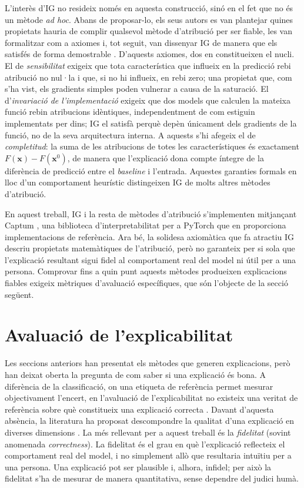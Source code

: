 L'interès d'\ac{IG} no resideix només en aquesta construcció, sinó en el fet que no és un mètode \emph{ad hoc}. Abans de proposar-lo, els seus autors es van plantejar quines propietats hauria de complir qualsevol mètode d'atribució per ser fiable, les van formalitzar com a axiomes i, tot seguit, van dissenyar \ac{IG} de manera que els satisfés de forma demostrable \cite{Sundarajan2017}. D'aquests axiomes, dos en constitueixen el nucli. El de \emph{sensibilitat} exigeix que tota característica que influeix en la predicció rebi atribució no nul·la i que, si no hi influeix, en rebi zero; una propietat que, com s'ha vist, els gradients simples poden vulnerar a causa de la saturació. El d'\emph{invariació de l'implementació} exigeix que dos models que calculen la mateixa funció rebin atribucions idèntiques, independentment de com estiguin implementats per dins; \ac{IG} el satisfà perquè depèn únicament dels gradients de la funció, no de la seva arquitectura interna. A aquests s'hi afegeix el de \emph{completitud}: la suma de les atribucions de totes les característiques és exactament $F(\mathbf{x}) - F(\mathbf{x}^0)$, de manera que l'explicació dona compte íntegre de la diferència de predicció entre el \emph{baseline} i l'entrada. Aquestes garanties formals en lloc d'un comportament heurístic distingeixen \ac{IG} de molts altres mètodes d'atribució.

En aquest treball, \ac{IG} i la resta de mètodes d'atribució s'implementen mitjançant Captum \cite{Kokhlikyan2020}, una biblioteca d'interpretabilitat per a PyTorch que en proporciona implementacions de referència. Ara bé, la solidesa axiomàtica que fa atractiu \ac{IG} descriu propietats matemàtiques de l'atribució, però no garanteix per si sola que l'explicació resultant sigui fidel al comportament real del model ni útil per a una persona. Comprovar fins a quin punt aquests mètodes produeixen explicacions fiables exigeix mètriques d'avaluació específiques, que són l'objecte de la secció següent.

\section{Avaluació de l'explicabilitat}
Les seccions anteriors han presentat els mètodes que generen explicacions, però han deixat oberta la pregunta de com saber si una explicació és bona. A diferència de la classificació, on una etiqueta de referència permet mesurar objectivament l'encert, en l'avaluació de l'explicabilitat no existeix una veritat de referència sobre què constitueix una explicació correcta \cite{Longo2024}. Davant d'aquesta absència, la literatura ha proposat descompondre la qualitat d'una explicació en diverses dimensions \cite{Hesse2023}. La més rellevant per a aquest treball és la \emph{fidelitat} (sovint anomenada \emph{correctness}). La fidelitat és el grau en què l'explicació reflecteix el comportament real del model, i no simplement allò que resultaria intuïtiu per a una persona. Una explicació pot ser plausible i, alhora, infidel; per això la fidelitat s'ha de mesurar de manera quantitativa, sense dependre del judici humà.

